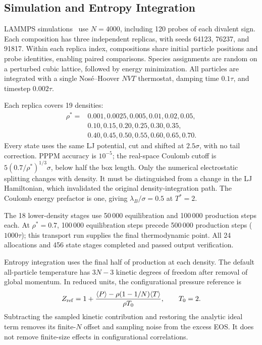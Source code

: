 \subsection{Simulation and Entropy Integration}

LAMMPS simulations~\cite{Plimpton1995} use $N=4000$, including 120 probes of each divalent sign. Each composition has three independent replicas, with seeds 64123, 76237, and 91817. Within each replica index, compositions share initial particle positions and probe identities, enabling paired comparisons. Species assignments are random on a perturbed cubic lattice, followed by energy minimization. All particles are integrated with a single Nos\'e--Hoover $NVT$ thermostat, damping time $0.1\tau$, and timestep $0.002\tau$.

Each replica covers 19 densities:
\begin{align}
\rho^*={}&0.001,0.0025,0.005,0.01,0.02,0.05,\nonumber\\
&0.10,0.15,0.20,0.25,0.30,0.35,\nonumber\\
&0.40,0.45,0.50,0.55,0.60,0.65,0.70.
\end{align}
Every state uses the same LJ potential, cut and shifted at $2.5\sigma$, with no tail correction. PPPM accuracy is $10^{-5}$; the real-space Coulomb cutoff is $5(0.7/\rho^*)^{1/3}\sigma$, below half the box length. Only the numerical electrostatic splitting changes with density. It must be distinguished from a change in the LJ Hamiltonian, which invalidated the original density-integration path. The Coulomb energy prefactor is one, giving $\lambda_B/\sigma=0.5$ at $T^*=2$.

The 18 lower-density stages use 50\,000 equilibration and 100\,000 production steps each. At $\rho^*=0.7$, 100\,000 equilibration steps precede 500\,000 production steps ($1000\tau$); this transport run supplies the final thermodynamic point. All 24 allocations and 456 state stages completed and passed output verification.

Entropy integration uses the final half of production at each density. The default all-particle temperature has $3N-3$ kinetic degrees of freedom after removal of global momentum. In reduced units, the configurational pressure reference is
\begin{equation}
Z_{\rm ref}=1+\frac{\langle P\rangle-\rho(1-1/N)\langle T\rangle}{\rho T_0},\qquad T_0=2.
\label{eq:config_pressure}
\end{equation}
Subtracting the sampled kinetic contribution and restoring the analytic ideal term removes its finite-$N$ offset and sampling noise from the excess EOS. It does not remove finite-size effects in configurational correlations.


